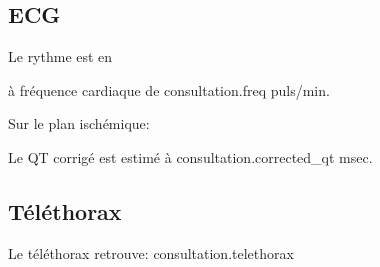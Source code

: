 \documentclass[headlines=6,headinclude=true,10pt]{scrartcl}
\begin{document}
\subsection{ECG}
Le rythme est en {%
          à fréquence cardiaque de {{ consultation.freq }} puls/min.\\

  {%
    {%
      Sur le plan ischémique: {%
              {%
                      {%
            Le QT corrigé est estimé à {{ consultation.corrected_qt }} msec. \\
            
            {%
              \subsection{Téléthorax}
              Le téléthorax retrouve: {{ consultation.telethorax }} \\
              
}}}}}}}
\end{document}
